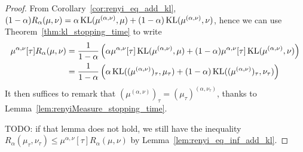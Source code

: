 \begin{proof}
From Corollary~\ref{cor:renyi_eq_add_kl}, $(1 - \alpha) R_\alpha(\mu, \nu) = \alpha \operatorname{KL}(\mu^{(\alpha, \nu)}, \mu) + (1 - \alpha)\operatorname{KL}(\mu^{(\alpha, \nu)}, \nu)$, hence we can use Theorem~\ref{thm:kl_stopping_time} to write
\begin{align*}
\mu^{\alpha, \nu}[\tau] R_\alpha(\mu, \nu)
&= \frac{1}{1 - \alpha}\left(\alpha \mu^{\alpha, \nu}[\tau]\operatorname{KL}(\mu^{(\alpha, \nu)}, \mu) + (1 - \alpha)\mu^{\alpha, \nu}[\tau]\operatorname{KL}(\mu^{(\alpha, \nu)}, \nu) \right)
\\
&= \frac{1}{1 - \alpha}\left(\alpha \operatorname{KL}((\mu^{(\alpha, \nu)})_\tau, \mu_\tau) + (1 - \alpha)\operatorname{KL}((\mu^{(\alpha, \nu)})_\tau, \nu_\tau) \right)
\end{align*}
It then suffices to remark that $(\mu^{(\alpha, \nu)})_\tau = (\mu_\tau)^{(\alpha, \nu_\tau)}$, thanks to Lemma~\ref{lem:renyiMeasure_stopping_time}.

TODO: if that lemma does not hold, we still have the inequality $R_\alpha(\mu_\tau, \nu_\tau) \le \mu^{\alpha, \nu}[\tau] R_\alpha(\mu, \nu)$ by Lemma~\ref{lem:renyi_eq_inf_add_kl}.
\end{proof}